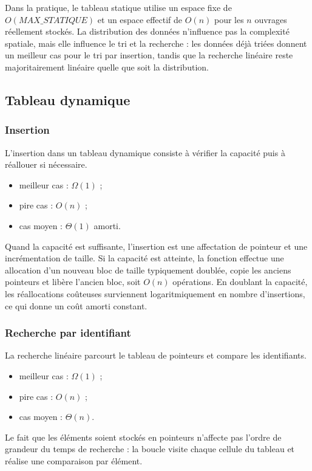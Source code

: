 \documentclass[12pt,a4paper]{article}
\begin{document}
Dans la pratique, le tableau statique utilise un espace fixe de $O(MAX\_STATIQUE)$ et un espace effectif de $O(n)$ pour les $n$ ouvrages réellement stockés. La distribution des données n’influence pas la complexité spatiale, mais elle influence le tri et la recherche : les données déjà triées donnent un meilleur cas pour le tri par insertion, tandis que la recherche linéaire reste majoritairement linéaire quelle que soit la distribution.

\subsection{Tableau dynamique}

\subsubsection{Insertion}
L’insertion dans un tableau dynamique consiste à vérifier la capacité puis à réallouer si nécessaire.
\begin{itemize}
  \item meilleur cas : $\Omega(1)$ ;
  \item pire cas : $O(n)$ ;
  \item cas moyen : $\Theta(1)$ amorti.
\end{itemize}
Quand la capacité est suffisante, l’insertion est une affectation de pointeur et une incrémentation de taille. Si la capacité est atteinte, la fonction effectue une allocation d’un nouveau bloc de taille typiquement doublée, copie les anciens pointeurs et libère l’ancien bloc, soit $O(n)$ opérations. En doublant la capacité, les réallocations coûteuses surviennent logaritmiquement en nombre d’insertions, ce qui donne un coût amorti constant.

\subsubsection{Recherche par identifiant}
La recherche linéaire parcourt le tableau de pointeurs et compare les identifiants.
\begin{itemize}
  \item meilleur cas : $\Omega(1)$ ;
  \item pire cas : $O(n)$ ;
  \item cas moyen : $\Theta(n)$.
\end{itemize}
Le fait que les éléments soient stockés en pointeurs n’affecte pas l’ordre de grandeur du temps de recherche : la boucle visite chaque cellule du tableau et réalise une comparaison par élément.
\end{document}
